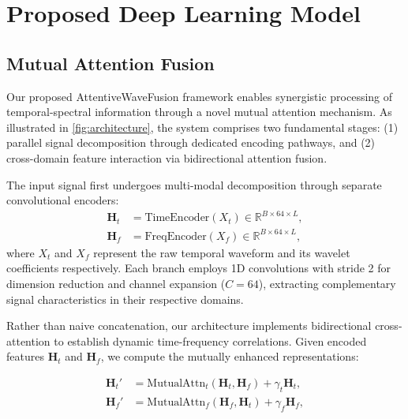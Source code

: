 \documentclass[12pt]{article}
\begin{document}
\section{Proposed Deep Learning Model}

\subsection{Mutual Attention Fusion}
\label{subsec:fusion}

Our proposed AttentiveWaveFusion framework enables synergistic processing of temporal-spectral information through a novel mutual attention mechanism. As illustrated in \autoref{fig:architecture}, the system comprises two fundamental stages: (1) parallel signal decomposition through dedicated encoding pathways, and (2) cross-domain feature interaction via bidirectional attention fusion.


The input signal first undergoes multi-modal decomposition through separate convolutional encoders:
\begin{equation}
    \begin{aligned}
        \mathbf{H}_t & = \text{TimeEncoder}(X_t) \in \mathbb{R}^{B \times 64 \times L}, \\
        \mathbf{H}_f & = \text{FreqEncoder}(X_f) \in \mathbb{R}^{B \times 64 \times L},
    \end{aligned}
\end{equation}
where $X_t$ and $X_f$ represent the raw temporal waveform and its wavelet coefficients respectively. Each branch employs 1D convolutions with stride 2 for dimension reduction and channel expansion ($C=64$), extracting complementary signal characteristics in their respective domains.


Rather than naive concatenation, our architecture implements bidirectional cross-attention to establish dynamic time-frequency correlations. Given encoded features $\mathbf{H}_t$ and $\mathbf{H}_f$, we compute the mutually enhanced representations:

\begin{equation}
    \begin{aligned}
        \mathbf{H}_t' & = \text{MutualAttn}_t(\mathbf{H}_t, \mathbf{H}_f) + \gamma_t \mathbf{H}_t, \\
        \mathbf{H}_f' & = \text{MutualAttn}_f(\mathbf{H}_f, \mathbf{H}_t) + \gamma_f \mathbf{H}_f,
    \end{aligned}
\end{equation}
\end{document}
